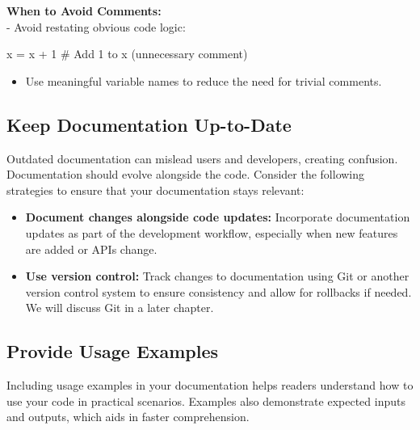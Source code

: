 \documentclass[
  letterpaper,
  DIV=11,
  numbers=noendperiod]{scrreprt}
\newenvironment{Shaded}{\begin{snugshade}}{\end{snugshade}}
\newcommand{\CommentTok}[1]{\textcolor[rgb]{0.37,0.37,0.37}{#1}}
\newcommand{\DecValTok}[1]{\textcolor[rgb]{0.68,0.00,0.00}{#1}}
\newcommand{\NormalTok}[1]{\textcolor[rgb]{0.00,0.23,0.31}{#1}}
\newcommand{\OperatorTok}[1]{\textcolor[rgb]{0.37,0.37,0.37}{#1}}
\providecommand{\tightlist}{%
  \setlength{\itemsep}{0pt}\setlength{\parskip}{0pt}}\usepackage{longtable,booktabs,array}
\begin{document}
\textbf{When to Avoid Comments:}\\
- Avoid restating obvious code logic:

\begin{Shaded}
\begin{Highlighting}[]
\NormalTok{x }\OperatorTok{=}\NormalTok{ x }\OperatorTok{+} \DecValTok{1}  \CommentTok{\# Add 1 to x (unnecessary comment)}
\end{Highlighting}
\end{Shaded}

\begin{itemize}
\tightlist
\item
  Use meaningful variable names to reduce the need for trivial comments.
\end{itemize}

\hypertarget{keep-documentation-up-to-date}{%
\subsection{Keep Documentation
Up-to-Date}\label{keep-documentation-up-to-date}}

Outdated documentation can mislead users and developers, creating
confusion. Documentation should evolve alongside the code. Consider the
following strategies to ensure that your documentation stays relevant:

\begin{itemize}
\tightlist
\item
  \textbf{Document changes alongside code updates:} Incorporate
  documentation updates as part of the development workflow, especially
  when new features are added or APIs change.
\item
  \textbf{Use version control:} Track changes to documentation using Git
  or another version control system to ensure consistency and allow for
  rollbacks if needed. We will discuss Git in a later chapter.
\end{itemize}

\hypertarget{provide-usage-examples}{%
\subsection{Provide Usage Examples}\label{provide-usage-examples}}

Including usage examples in your documentation helps readers understand
how to use your code in practical scenarios. Examples also demonstrate
expected inputs and outputs, which aids in faster comprehension.
\end{document}
